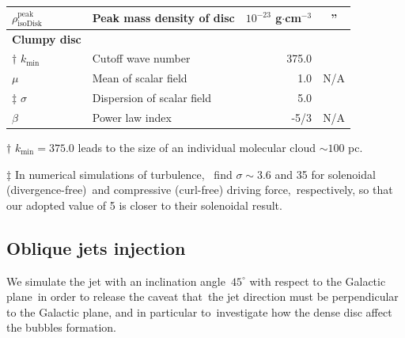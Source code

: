 \documentclass[twocolumn]{aastex631}
\begin{document}
\begin{table}[t]
\begin{tabular}{@{}llrc@{}}
$\rho_{\text{isoDisk}}^{\text{peak}}$ & Peak mass density of disc                 & $10^{-23}$ g$\cdot$cm$^{-3}$         & \multicolumn{1}{c}{''}         \\ \hline
{\bf Clumpy disc }                    &                                           &                                      &                                \\
$\dagger$  $k_{\text{min}}$           & Cutoff wave number                        & 375.0                                & \citep{peak-ism-density}       \\
$\mu$                                 & Mean of scalar field                      & 1.0                                  &   N/A                          \\
$\ddag$  $\sigma$                     & Dispersion of scalar field                & 5.0                                  & \citep{Federrath2010}          \\
$\beta$                               & Power law index                           & -5/3                                 &   N/A                          \\ \midrule
\end{tabular}
\begin{tablenotes}
      \raggedright
      \item  $\dagger$  $k_{\text{min}}=375.0$ leads to the size of an individual molecular cloud $\sim 100$ pc.
      \item  $\ddag$ In numerical simulations of turbulence,\
             \citet{Federrath2010} find $\sigma\sim 3.6$ and 35 for solenoidal (divergence-free)\
             and compressive (curl-free) driving force,\
             respectively, so that our adopted value of 5 is closer to their solenoidal result.
    \end{tablenotes}
\end{table}


%

\subsection{Oblique jets injection}

  We simulate the jet with an inclination angle\
  $45^{\circ}$ with respect to the Galactic plane\
  in order to release the caveat that\
  the jet direction must be perpendicular to the Galactic plane, and in particular to\
  investigate how the dense disc affect the bubbles formation.
\end{document}
